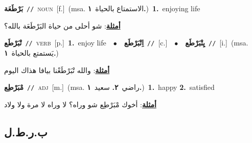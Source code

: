 \documentclass[10pt,a4paper,twoside]{article} %
\begin{document}
\begin{multicols}{2}
{\setlength\topsep{0pt}\textbf{\foreignlanguage{arabic}{بَرْطَعَة}}\ {\color{gray}\texttt{//}\color{black}}\ \textsc{noun}\ [f.]\ \color{gray}(msa. \foreignlanguage{arabic}{الاستمتاع بالحياة}~\foreignlanguage{arabic}{\textbf{١.}})\color{black}\ \textbf{1.}~enjoying life\  \begin{flushright}\color{gray}\foreignlanguage{arabic}{\textbf{\underline{\foreignlanguage{arabic}{أمثلة}}}: شو أحلى من حياة البَرْطَعَة بالله؟}\end{flushright}\color{black}} \vspace{2mm}

{\setlength\topsep{0pt}\textbf{\foreignlanguage{arabic}{تْبَرْطَع}}\ {\color{gray}\texttt{//}\color{black}}\ \textsc{verb}\ [p.]\ \textbf{1.}~enjoy life\ \ $\bullet$\ \ \setlength\topsep{0pt}\textbf{\foreignlanguage{arabic}{اِتْبَرْطَع}}\ {\color{gray}\texttt{//}\color{black}}\ [c.]\ \ $\bullet$\ \ \setlength\topsep{0pt}\textbf{\foreignlanguage{arabic}{يِتْبَرْطَع}}\ {\color{gray}\texttt{//}\color{black}}\ [i.]\ \color{gray}(msa. \foreignlanguage{arabic}{يَستمتع بالحياة}~\foreignlanguage{arabic}{\textbf{١.}})\color{black}\  \begin{flushright}\color{gray}\foreignlanguage{arabic}{\textbf{\underline{\foreignlanguage{arabic}{أمثلة}}}: والله تْبَرْطَعْنا بيافا هذاك اليوم}\end{flushright}\color{black}} \vspace{2mm}

{\setlength\topsep{0pt}\textbf{\foreignlanguage{arabic}{مْبَرْطِع}}\ {\color{gray}\texttt{//}\color{black}}\ \textsc{adj}\ [m.]\ \color{gray}(msa. \foreignlanguage{arabic}{راضي}~\foreignlanguage{arabic}{\textbf{٢.}}  \foreignlanguage{arabic}{سعيد}~\foreignlanguage{arabic}{\textbf{١.}})\color{black}\ \textbf{1.}~happy  \textbf{2.}~satisfied\  \begin{flushright}\color{gray}\foreignlanguage{arabic}{\textbf{\underline{\foreignlanguage{arabic}{أمثلة}}}: أخوك مْبَرْطِع شو وراه؟ لا وراه لا مرة ولا ولاد}\end{flushright}\color{black}} \vspace{2mm}

\vspace{-3mm}
\subsection*{\color{blue}\foreignlanguage{arabic}{ب.ر.ط.ل}\color{blue}{}} 


\end{multicols}
\end{document}
